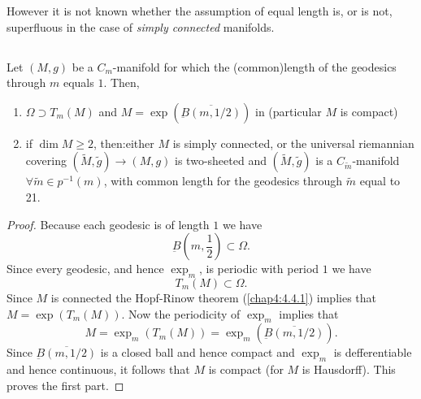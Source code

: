 However \pageoriginale it is not known whether the assumption of equal 
length is, or is not, superfluous in the case of {\em simply
  connected} manifolds.


\subsection{}\label{chap4:4.6.5}

\begin{prop*}
Let $(M,g)$ be a $C_{m}$-manifold for which the (common)\break length of the
geodesics through $m$ equals $1$. Then,
\begin{enumerate}
\renewcommand{\labelenumi}{\theenumi)}
\item $\Omega\supset T_{m}(M)$ and
  $M=\exp(\overline{\underbar{B}(m,1/2)})$ in (particular $M$ is
  compact)

\item if $\dim M\geq 2$, then:either $M$ is simply connected, or the
  universal riemannian covering $(\widetilde{M},\widetilde{g})\to
  (M,g)$ is two-sheeted and $(\widetilde{M},\widetilde{g})$ is a
  $C_{\widetilde{m}}$-manifold $\forall \widetilde{m}\in p^{-1}(m)$,
  with common length for the geodesics through $\widetilde{m}$ equal
  to 21.
\end{enumerate}
\end{prop*}

\begin{proof}
Because each geodesic is of length $1$ we have
$$
\underbar{B}(m,\frac{1}{2})\subset \Omega.
$$
Since every geodesic, and hence $\exp_{m}$, is periodic with period
$1$ we have
$$
T_{m}(M)\subset \Omega.
$$
Since $M$ is connected the Hopf-Rinow theorem (\ref{chap4:4.4.1}) implies
that $M=\exp(T_{m}(M))$. Now the periodicity of $\exp_{m}$ implies
that
$$
M=\exp_{m}(T_{m}(M))=\exp_{m}(\overline{\underbar{B}(m,1/2)}).
$$
Since $\overline{\underbar{B}(m,1/2)}$ is a closed ball and hence
compact and $\exp_{m}$ is defferentiable and hence continuous, it
follows that $M$ is compact (for $M$ is Hausdorff). This proves the
first part.
\end{proof}

